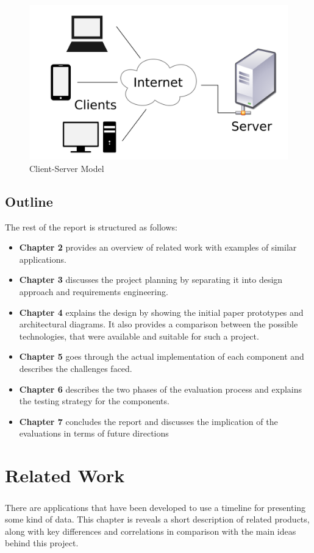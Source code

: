 \documentclass{l4proj}
\begin{document}
\begin{figure}[H]
	\centering
	\includegraphics[width=.5\textwidth]{images/clientserver}
	\caption{Client-Server Model}
	\label{fig:clientserver}
\end{figure} 

\section{Outline}
The rest of the report is structured as follows:
\begin{itemize}
	\item \textbf{Chapter 2} provides an overview of related work with examples of similar applications.
	
	\item \textbf{Chapter 3} discusses the project planning by separating it into design approach and requirements engineering.
	\item \textbf{Chapter 4} explains the design by showing the initial paper prototypes and architectural diagrams. It also provides a comparison between the possible technologies, that were available and suitable for such a project.
	\item \textbf{Chapter 5} goes through the actual implementation of each component and describes the challenges faced. 
	\item \textbf{Chapter 6} describes the two phases of the evaluation process and explains the testing strategy for the components.
	\item \textbf{Chapter 7} concludes the report and discusses the implication of the evaluations in terms of future directions
\end{itemize}


\chapter{Related Work}
\paragraph{}
There are applications that have been developed to use a timeline for presenting some kind of data. This chapter is reveals a short description of related products, along with key differences and correlations in comparison with the main ideas behind this project.  
\end{document}
